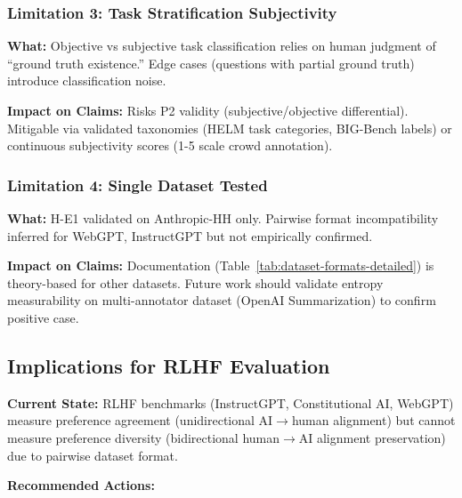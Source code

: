 \subsubsection{Limitation 3: Task Stratification Subjectivity}

\textbf{What:} Objective vs subjective task classification relies on human judgment of ``ground truth existence.'' Edge cases (questions with partial ground truth) introduce classification noise.

\textbf{Impact on Claims:} Risks P2 validity (subjective/objective differential). Mitigable via validated taxonomies (HELM task categories, BIG-Bench labels) or continuous subjectivity scores (1-5 scale crowd annotation).

\subsubsection{Limitation 4: Single Dataset Tested}

\textbf{What:} H-E1 validated on Anthropic-HH only. Pairwise format incompatibility inferred for WebGPT, InstructGPT but not empirically confirmed.

\textbf{Impact on Claims:} Documentation (Table~\ref{tab:dataset-formats-detailed}) is theory-based for other datasets. Future work should validate entropy measurability on multi-annotator dataset (OpenAI Summarization) to confirm positive case.

\subsection{Implications for RLHF Evaluation}

\textbf{Current State:} RLHF benchmarks (InstructGPT, Constitutional AI, WebGPT) measure preference agreement (unidirectional AI$\rightarrow$human alignment) but cannot measure preference diversity (bidirectional human$\rightarrow$AI alignment preservation) due to pairwise dataset format.

\textbf{Recommended Actions:}

